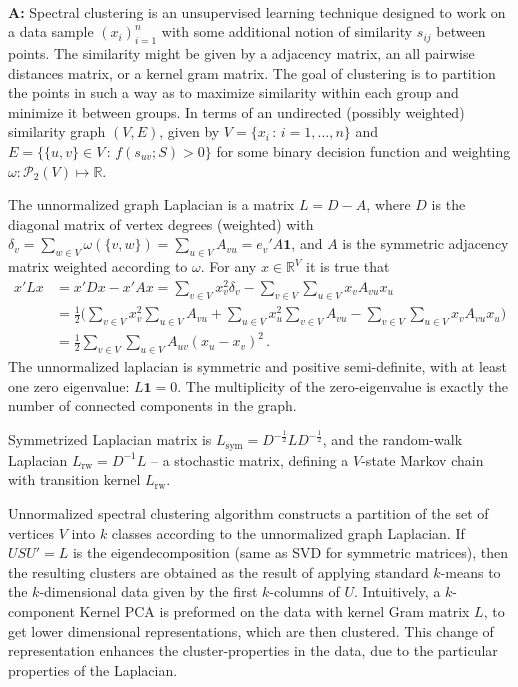 \documentclass[a4paper]{article}
\newcommand{\Real}{\mathbb{R}}
\newcommand{\one}{\mathbf{1}}
\begin{document}
\hfill\\\textbf{A:}
Spectral clustering is an unsupervised learning technique designed to work on a data
sample $(x_i)_{i=1}^n$ with some additional notion of similarity $s_{ij}$ between
points. The similarity might be given by a adjacency matrix, an all pairwise distances
matrix, or a kernel gram matrix. The goal of clustering is to partition the points
in such a way as to maximize similarity within each group and minimize it between
groups. In terms of an undirected (possibly weighted) similarity graph $(V, E)$,
given by $V = \{x_i \,:\, i=1,\ldots, n\}$ and $E = \{\{u, v\}\in V\,:\, f(s_{uv}; S) > 0\}$
for some binary decision function and weighting $\omega:\mathcal{P}_2(V)\mapsto
\Real$.

The unnormalized graph Laplacian is a matrix $L = D - A$, where $D$ is the diagonal
matrix of vertex degrees (weighted) with $\delta_v = \sum_{w\in V} \omega(\{v, w\})
= \sum_{u\in V} A_{vu} = e_v' A \one$, and $A$ is the symmetric adjacency matrix
weighted according to $\omega$. For any $x\in\Real^V$ it is true that
\begin{align*}
x' L x
    &= x' D x - x' A x = \sum_{v\in V} x_v^2 \delta_v
     - \sum_{v\in V} \sum_{u\in V} x_v A_{vu} x_u \\
    &= \frac{1}{2}\bigl(\sum_{v\in V} x_v^2 \sum_{u\in V} A_{vu} 
     + \sum_{u\in V} x_u^2 \sum_{v\in V} A_{vu}
     - \sum_{v\in V} \sum_{u\in V} x_v A_{vu} x_u \bigr)\\
    &= \frac{1}{2} \sum_{v\in V} \sum_{u\in V} A_{uv} (x_u - x_v)^2 \,.
\end{align*}
The unnormalized laplacian is symmetric and positive semi-definite, with at least
one zero eigenvalue: $L\one = 0$. The multiplicity of the zero-eigenvalue is exactly
the number of connected components in the graph.

Symmetrized Laplacian matrix is $L_\text{sym} = D^{-\frac{1}{2}} L D^{-\frac{1}{2}}$,
and the random-walk Laplacian $L_\text{rw} = D^{-1} L$ -- a stochastic matrix, defining
a $V$-state Markov chain with transition kernel $L_\text{rw}$.

Unnormalized spectral clustering algorithm constructs a partition of the set of
vertices $V$ into $k$ classes according to the unnormalized graph Laplacian. If
$USU' = L$ is the eigendecomposition (same as SVD for symmetric matrices), then
the resulting clusters are obtained as the result of applying standard $k$-means
to the $k$-dimensional data given by the first $k$-columns of $U$. Intuitively,
a $k$-component Kernel PCA is preformed on the data with kernel Gram matrix $L$,
to get lower dimensional representations, which are then clustered. This change
of representation enhances the cluster-properties in the data, due to the particular
properties of the Laplacian. 
\end{document}
